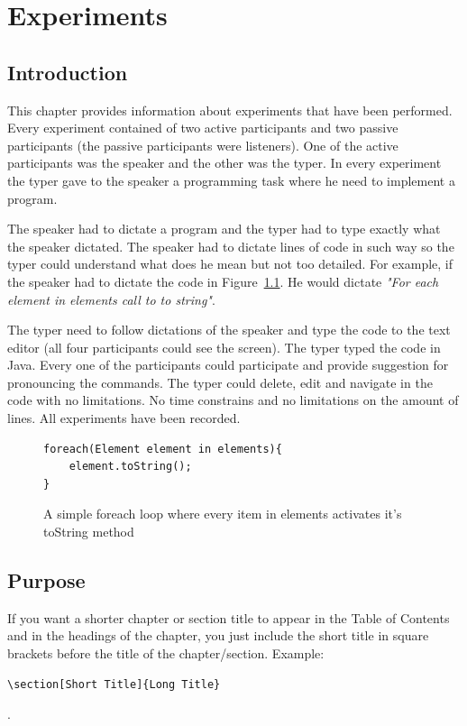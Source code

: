 \chapter{Experiments}
\section{Introduction}
This chapter provides information about experiments that have been performed. Every experiment contained of two active participants and two passive participants (the passive participants were listeners). One of the active participants was the speaker and the other was the typer. In every experiment the typer gave to the speaker a programming task where he need to implement a program. 

The speaker had to dictate a program and the typer had to type exactly what the speaker dictated. The speaker had to dictate lines of code in such way so the typer could understand what does he mean but not too detailed. For example, if the speaker had to dictate the code in Figure~\ref{fig1}. He would dictate \textit{"For each element in elements call to to string"}. 

The typer need to follow dictations of the speaker and type the code to the text editor (all four participants could see the screen). The typer typed the code in Java. Every one of the participants could participate and provide suggestion for pronouncing the commands. The typer could delete, edit and navigate in the code with no limitations. No time constrains and no limitations on the amount of lines. All experiments have been recorded.
\begin{figure}
\begin{lstlisting}
foreach(Element element in elements){
	element.toString();
} 
\end{lstlisting}
\caption{A simple foreach loop where every item in elements activates it's toString method}
\label{fig1}
\end{figure}
\section{Purpose}


\iffalse
\begin{remark}
If you want a shorter chapter or section title to appear in the Table of Contents and in the headings of the chapter, you just include the short title in square brackets before the title of the chapter/section. Example: \begin{verbatim}\section[Short Title]{Long Title}\end{verbatim}.
\end{remark}

